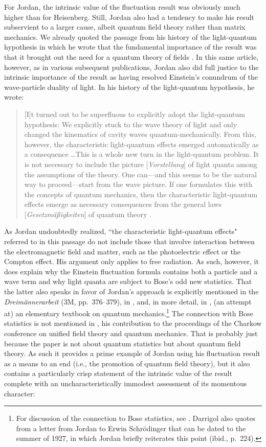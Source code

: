 \documentclass[12pt]{elsart}
\begin{document}
For Jordan, the intrinsic value of the fluctuation result was obviously much higher than for Heisenberg. Still, Jordan also had a tendency to make his result subservient to a larger cause, albeit quantum field theory rather than matrix mechanics. We already quoted the passage from his history of the light-quantum hypothesis in which he wrote that the fundamental importance of the result was that it brought out the need for a quantum theory of fields \citep[pp.\ 195--196]{Jordan 1928}. In this same article, however, as in various subsequent publications, Jordan also did full justice to the intrinsic importance of the result as having resolved Einstein's conundrum of the wave-particle duality of light. In his history of the light-quantum hypothesis, he wrote: 
\begin{quotation}
[I]t turned out to be superfluous to explicitly adopt the light-quantum hypothesis: We explicitly stuck to the wave theory of light and only changed the kinematics of cavity waves quantum-mechanically. From this, however, the characteristic light-quantum effects emerged automatically as a consequence \ldots This is a whole new turn in the light-quantum problem. It is not necessary to include the picture [{\it Vorstellung}] of light quanta among the assumptions of the theory. One can---and this seems to be the natural way to proceed---start from the wave picture. If one formulates this with the concepts of quantum mechanics, then the characteristic light-quantum effects emerge as necessary consequences from the general laws [{\it Gesetzm\"a\ss igkeiten}] of quantum theory \citep[p.\ 195]{Jordan 1928}.
\end{quotation}
As Jordan undoubtedly realized, ``the characteristic light-quantum effects" referred to in this passage do not include those that involve interaction between the electromagnetic field and matter, such as the photoelectric effect or the Compton effect. His argument only applies to free radiation. As such, however, it does explain why the Einstein fluctuation formula contains both a particle and a wave term and why light quanta are subject to Bose's odd new statistics. That the latter also speaks in favor of Jordan's approach is explicitly mentioned in the {\it Dreim\"annerarbeit} (3M, pp.\ 376--379), in \citep[p.\ 182]{Jordan 1928}, and, in more detail, in \citep[p.\ 220]{Jordan 1936}, (an attempt at) an elementary textbook on quantum mechanics.\footnote{For discussion of the connection to Bose statistics, see \citep[p.\ 221]{Darrigol 1986}. Darrigol also quotes from a letter from Jordan to Erwin Schr\"odinger that can be dated to the summer of 1927, in which Jordan briefly reiterates this point (ibid., p.\ 224).} The connection with Bose statistics is not mentioned in \citep{Jordan 1929}, his contribution to the proceedings of the Charkow conference on unified field theory and quantum mechanics. That is probably just because the paper is not about quantum statistics but about quantum field theory. As such it provides a prime example of Jordan using his fluctuation result as a means to an end (i.e., the promotion of quantum field theory), but it also contains a particularly crisp statement of the intrinsic value of the result complete with an uncharacteristically immodest  assessment of its momentous character: 
\end{document}
